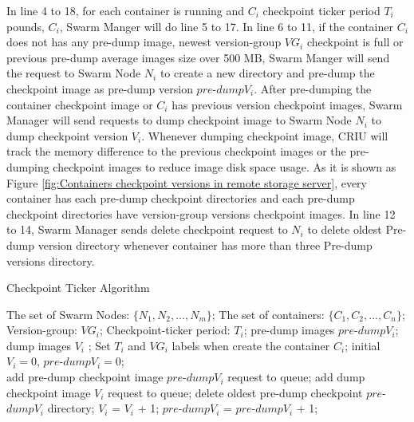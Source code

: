 In line 4 to 18, for each container is running and $C_i$ checkpoint ticker period $T_i$ pounds, $C_i$, Swarm Manger will do line 5 to 17.
In line 6 to 11, if the container $C_i$ does not has any pre-dump image, newest version-group $VG_i$ checkpoint is full or previous pre-dump average images size over 500 MB, Swarm Manger will send the request to Swarm Node $N_i$ to create a new directory and pre-dump the checkpoint image as pre-dump version $pre$-$dump V_i$.
After pre-dumping the container checkpoint image or $C_i$ has previous version checkpoint images, Swarm Manager will send requests to dump checkpoint image to Swarm Node $N_i$ to dump checkpoint version $V_i$. Whenever dumping checkpoint image, CRIU will track the memory difference to the previous checkpoint images or the pre-dumping checkpoint images to reduce image disk space usage.
As it is shown as Figure \ref{fig:Containers checkpoint versions in remote storage server}, every container has each pre-dump checkpoint directories and each pre-dump checkpoint directories have version-group versions checkpoint images.
In line 12 to 14, Swarm Manager sends delete checkpoint request to $N_i$ to delete oldest Pre-dump version directory whenever container has more than three Pre-dump versions directory.

\begin{algorithm}[hbtp]
    \caption{Checkpoint Ticker Algorithm}
    \label{code:checkpointTicker}
    \begin{algorithmic}[1]
	\Require
		The set of Swarm Nodes: $\lbrace N_1,N_2,...,N_m \rbrace $;
		The set of containers: $\lbrace C_1,C_2,...,C_n \rbrace$;
		Version-group: $ VG_i $;
		Checkpoint-ticker period: $ T_i $;
	\Ensure
		pre-dump images $ pre$-$dump V_i $; dump images $ V_i $ ;
        \State Set $ T_i $ and $ VG_i $ labels when create the container $ C_i $;
        \State initial $ V_i=0 $, $ pre$-$dump V_i=0 $;
        \\
						\State add pre-dump checkpoint image $ pre $-$ dump V_i $ request to queue;
					\EndIf
				\EndIf
			\State add dump checkpoint image $ V_i $ request to queue;
                	\State delete oldest pre-dump checkpoint $ pre $-$ dump V_i $ directory;
				\EndIf
            	\State $ V_i $ = $ V_ i$ + 1;
					\State $ pre $-$ dump V_i $ = $ pre $-$ dump V_i $ + 1;
				\EndIf
			\EndWhile
		\EndFor
	\end{algorithmic}
\end{algorithm}

